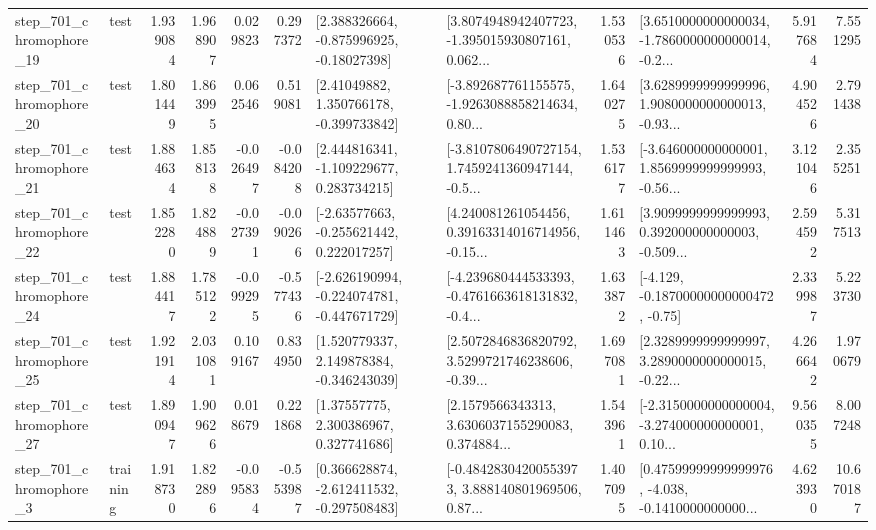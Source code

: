 \begin{tabular}{llrrrrllrlrr}
  step\_701\_chromophore\_19 &      test &      1.939084 &    1.968907 &      0.029823 &  0.297372 &    [2.388326664, -0.875996925, -0.18027398] &  [3.8074948942407723, -1.395015930807161, 0.062... &       1.530536 &  [3.6510000000000034, -1.7860000000000014, -0.2... &            5.917684 &          7.551295 \\
  step\_701\_chromophore\_20 &      test &      1.801449 &    1.863995 &      0.062546 &  0.519081 &     [2.41049882, 1.350766178, -0.399733842] &  [-3.892687761155575, -1.9263088858214634, 0.80... &       1.640275 &  [3.6289999999999996, 1.9080000000000013, -0.93... &            4.904526 &          2.791438 \\
  step\_701\_chromophore\_21 &      test &      1.884634 &    1.858138 &     -0.026497 & -0.084208 &    [2.444816341, -1.109229677, 0.283734215] &  [-3.8107806490727154, 1.7459241360947144, -0.5... &       1.536177 &  [-3.646000000000001, 1.8569999999999993, -0.56... &            3.121046 &          2.355251 \\
  step\_701\_chromophore\_22 &      test &      1.852280 &    1.824889 &     -0.027391 & -0.090266 &    [-2.63577663, -0.255621442, 0.222017257] &  [4.240081261054456, 0.39163314016714956, -0.15... &       1.611463 &  [3.9099999999999993, 0.392000000000003, -0.509... &            2.594592 &          5.317513 \\
  step\_701\_chromophore\_24 &      test &      1.884417 &    1.785122 &     -0.099295 & -0.577436 &  [-2.626190994, -0.224074781, -0.447671729] &  [-4.239680444533393, -0.4761663618131832, -0.4... &       1.633872 &              [-4.129, -0.18700000000000472, -0.75] &            2.339987 &          5.223730 \\
  step\_701\_chromophore\_25 &      test &      1.921914 &    2.031081 &      0.109167 &  0.834950 &    [1.520779337, 2.149878384, -0.346243039] &  [2.5072846836820792, 3.5299721746238606, -0.39... &       1.697081 &  [2.3289999999999997, 3.2890000000000015, -0.22... &            4.266642 &          1.970679 \\
  step\_701\_chromophore\_27 &      test &      1.890947 &    1.909626 &      0.018679 &  0.221868 &      [1.37557775, 2.300386967, 0.327741686] &  [2.1579566343313, 3.6306037155290083, 0.374884... &       1.543961 &  [-2.3150000000000004, -3.274000000000001, 0.10... &            9.560355 &          8.007248 \\
   step\_701\_chromophore\_3 &  training &      1.918730 &    1.822896 &     -0.095834 & -0.553987 &   [0.366628874, -2.612411532, -0.297508483] &  [-0.48428304200553973, 3.888140801969506, 0.87... &       1.407095 &  [0.47599999999999976, -4.038, -0.1410000000000... &            4.623930 &         10.670187 \\

\end{tabular}
